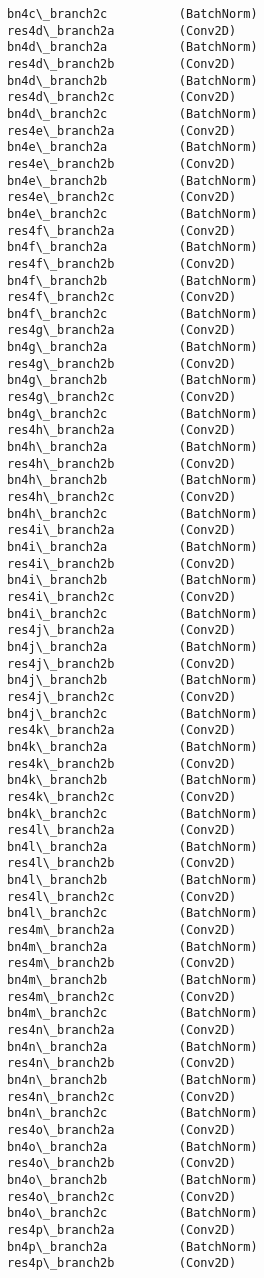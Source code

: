 \documentclass[11pt]{article}
\begin{document}
\begin{Verbatim}[commandchars=\\\{\}]
bn4c\_branch2c          (BatchNorm)
res4d\_branch2a         (Conv2D)
bn4d\_branch2a          (BatchNorm)
res4d\_branch2b         (Conv2D)
bn4d\_branch2b          (BatchNorm)
res4d\_branch2c         (Conv2D)
bn4d\_branch2c          (BatchNorm)
res4e\_branch2a         (Conv2D)
bn4e\_branch2a          (BatchNorm)
res4e\_branch2b         (Conv2D)
bn4e\_branch2b          (BatchNorm)
res4e\_branch2c         (Conv2D)
bn4e\_branch2c          (BatchNorm)
res4f\_branch2a         (Conv2D)
bn4f\_branch2a          (BatchNorm)
res4f\_branch2b         (Conv2D)
bn4f\_branch2b          (BatchNorm)
res4f\_branch2c         (Conv2D)
bn4f\_branch2c          (BatchNorm)
res4g\_branch2a         (Conv2D)
bn4g\_branch2a          (BatchNorm)
res4g\_branch2b         (Conv2D)
bn4g\_branch2b          (BatchNorm)
res4g\_branch2c         (Conv2D)
bn4g\_branch2c          (BatchNorm)
res4h\_branch2a         (Conv2D)
bn4h\_branch2a          (BatchNorm)
res4h\_branch2b         (Conv2D)
bn4h\_branch2b          (BatchNorm)
res4h\_branch2c         (Conv2D)
bn4h\_branch2c          (BatchNorm)
res4i\_branch2a         (Conv2D)
bn4i\_branch2a          (BatchNorm)
res4i\_branch2b         (Conv2D)
bn4i\_branch2b          (BatchNorm)
res4i\_branch2c         (Conv2D)
bn4i\_branch2c          (BatchNorm)
res4j\_branch2a         (Conv2D)
bn4j\_branch2a          (BatchNorm)
res4j\_branch2b         (Conv2D)
bn4j\_branch2b          (BatchNorm)
res4j\_branch2c         (Conv2D)
bn4j\_branch2c          (BatchNorm)
res4k\_branch2a         (Conv2D)
bn4k\_branch2a          (BatchNorm)
res4k\_branch2b         (Conv2D)
bn4k\_branch2b          (BatchNorm)
res4k\_branch2c         (Conv2D)
bn4k\_branch2c          (BatchNorm)
res4l\_branch2a         (Conv2D)
bn4l\_branch2a          (BatchNorm)
res4l\_branch2b         (Conv2D)
bn4l\_branch2b          (BatchNorm)
res4l\_branch2c         (Conv2D)
bn4l\_branch2c          (BatchNorm)
res4m\_branch2a         (Conv2D)
bn4m\_branch2a          (BatchNorm)
res4m\_branch2b         (Conv2D)
bn4m\_branch2b          (BatchNorm)
res4m\_branch2c         (Conv2D)
bn4m\_branch2c          (BatchNorm)
res4n\_branch2a         (Conv2D)
bn4n\_branch2a          (BatchNorm)
res4n\_branch2b         (Conv2D)
bn4n\_branch2b          (BatchNorm)
res4n\_branch2c         (Conv2D)
bn4n\_branch2c          (BatchNorm)
res4o\_branch2a         (Conv2D)
bn4o\_branch2a          (BatchNorm)
res4o\_branch2b         (Conv2D)
bn4o\_branch2b          (BatchNorm)
res4o\_branch2c         (Conv2D)
bn4o\_branch2c          (BatchNorm)
res4p\_branch2a         (Conv2D)
bn4p\_branch2a          (BatchNorm)
res4p\_branch2b         (Conv2D)

\end{Verbatim}
\end{document}
